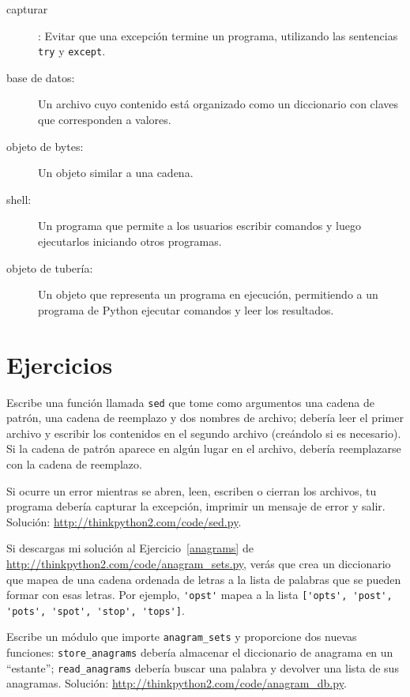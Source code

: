 \documentclass[10pt]{book}
\begin{document}
\begin{description}
\item[capturar]: Evitar que una excepción termine
un programa, utilizando las sentencias {\tt try}
y {\tt except}.

\item[base de datos:] Un archivo cuyo contenido está organizado como un diccionario
con claves que corresponden a valores.

\item[objeto de bytes:] Un objeto similar a una cadena.

\item[shell:] Un programa que permite a los usuarios escribir comandos y luego
ejecutarlos iniciando otros programas.

\item[objeto de tubería:] Un objeto que representa un programa en ejecución, permitiendo
a un programa de Python ejecutar comandos y leer los resultados.

\end{description}


\section{Ejercicios}

\begin{exercise}

Escribe una función llamada {\tt sed} que tome como argumentos una cadena de patrón,
una cadena de reemplazo y dos nombres de archivo; debería leer el primer archivo
y escribir los contenidos en el segundo archivo (creándolo si es
necesario).  Si la cadena de patrón aparece en algún lugar en el archivo,
debería reemplazarse con la cadena de reemplazo.

Si ocurre un error mientras se abren, leen, escriben o cierran los archivos,
tu programa debería capturar la excepción, imprimir un mensaje de error y
salir.  Solución: \url{http://thinkpython2.com/code/sed.py}.

\end{exercise}


\begin{exercise}

Si descargas mi solución al Ejercicio~\ref{anagrams} de
\url{http://thinkpython2.com/code/anagram_sets.py}, verás que crea
un diccionario que mapea de una cadena ordenada de letras a la lista de
palabras que se pueden formar con esas letras.  Por ejemplo,
\verb"'opst'" mapea a la lista
\verb"['opts', 'post', 'pots', 'spot', 'stop', 'tops']".

Escribe un módulo que importe \verb"anagram_sets" y proporcione
dos nuevas funciones: \verb"store_anagrams" debería almacenar el
diccionario de anagrama en un ``estante''; \verb"read_anagrams" debería
buscar una palabra y devolver una lista de sus anagramas.
Solución: \url{http://thinkpython2.com/code/anagram_db.py}.

\end{exercise}
\end{document}

